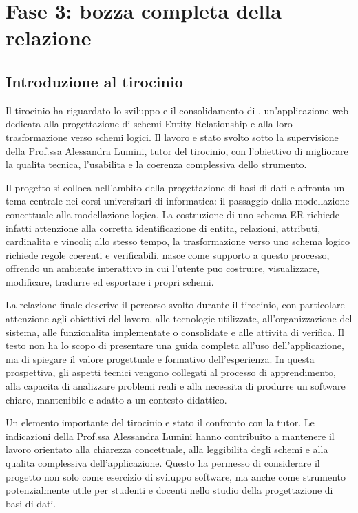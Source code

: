 
\chapter{Fase 3: bozza completa della relazione}

\section{Introduzione al tirocinio}

Il tirocinio ha riguardato lo sviluppo e il consolidamento di \builder, un'applicazione web dedicata alla progettazione di schemi Entity-Relationship e alla loro trasformazione verso schemi logici. Il lavoro e stato svolto sotto la supervisione della Prof.ssa Alessandra Lumini, tutor del tirocinio, con l'obiettivo di migliorare la qualita tecnica, l'usabilita e la coerenza complessiva dello strumento.

Il progetto si colloca nell'ambito della progettazione di basi di dati e affronta un tema centrale nei corsi universitari di informatica: il passaggio dalla modellazione concettuale alla modellazione logica. La costruzione di uno schema ER richiede infatti attenzione alla corretta identificazione di entita, relazioni, attributi, cardinalita e vincoli; allo stesso tempo, la trasformazione verso uno schema logico richiede regole coerenti e verificabili. \builder{} nasce come supporto a questo processo, offrendo un ambiente interattivo in cui l'utente puo costruire, visualizzare, modificare, tradurre ed esportare i propri schemi.

La relazione finale descrive il percorso svolto durante il tirocinio, con particolare attenzione agli obiettivi del lavoro, alle tecnologie utilizzate, all'organizzazione del sistema, alle funzionalita implementate o consolidate e alle attivita di verifica. Il testo non ha lo scopo di presentare una guida completa all'uso dell'applicazione, ma di spiegare il valore progettuale e formativo dell'esperienza. In questa prospettiva, gli aspetti tecnici vengono collegati al processo di apprendimento, alla capacita di analizzare problemi reali e alla necessita di produrre un software chiaro, mantenibile e adatto a un contesto didattico.

Un elemento importante del tirocinio e stato il confronto con la tutor. Le indicazioni della Prof.ssa Alessandra Lumini hanno contribuito a mantenere il lavoro orientato alla chiarezza concettuale, alla leggibilita degli schemi e alla qualita complessiva dell'applicazione. Questo ha permesso di considerare il progetto non solo come esercizio di sviluppo software, ma anche come strumento potenzialmente utile per studenti e docenti nello studio della progettazione di basi di dati.

